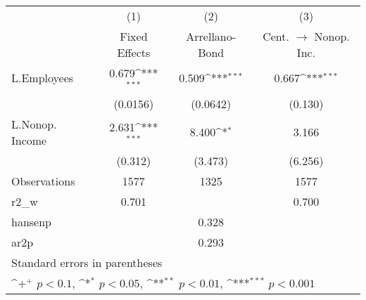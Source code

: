 {
\def\sym#1{\ifmmode^{#1}\else\(^{#1}\)\fi}
\begin{tabular}{l*{3}{c}}
\hline\hline
                    &\multicolumn{1}{c}{(1)}&\multicolumn{1}{c}{(2)}&\multicolumn{1}{c}{(3)}\\
                    &\multicolumn{1}{c}{Fixed Effects}&\multicolumn{1}{c}{Arrellano-Bond}&\multicolumn{1}{c}{Cent. $\rightarrow$ Nonop. Inc.}\\
\hline
L.Employees         &       0.679\sym{***}&       0.509\sym{***}&       0.667\sym{***}\\
                    &    (0.0156)         &    (0.0642)         &     (0.130)         \\
L.Nonop. Income     &       2.631\sym{***}&       8.400\sym{*}  &       3.166         \\
                    &     (0.312)         &     (3.473)         &     (6.256)         \\
\hline
Observations        &        1577         &        1325         &        1577         \\
r2\_w                &       0.701         &                     &       0.700         \\
hansenp             &                     &       0.328         &                     \\
ar2p                &                     &       0.293         &                     \\
\hline\hline
\multicolumn{4}{l}{\footnotesize Standard errors in parentheses}\\
\multicolumn{4}{l}{\footnotesize \sym{+} \(p<0.1\), \sym{*} \(p<0.05\), \sym{**} \(p<0.01\), \sym{***} \(p<0.001\)}\\
\end{tabular}
}

